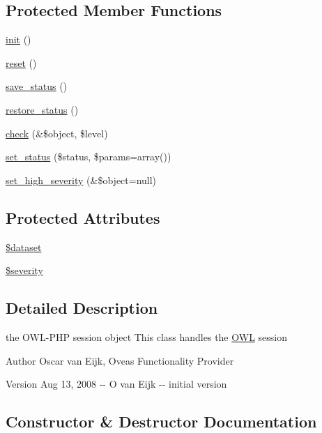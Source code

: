 \subsection*{Protected Member Functions}
\begin{DoxyCompactItemize}
\item 
\hyperlink{class__OWL_ae0ef3ded56e8a6b34b6461e5a721cd3e}{init} ()
\item 
\hyperlink{class__OWL_a2f2a042bcf31965194c03033df0edc9b}{reset} ()
\item 
\hyperlink{class__OWL_a9e49b9c76fbc021b244c6915ea536d71}{save\_\-status} ()
\item 
\hyperlink{class__OWL_a465eeaf40edd9f9c848841700c32ce55}{restore\_\-status} ()
\item 
\hyperlink{class__OWL_ad6f4f6946f40199dd0333cf219fa500e}{check} (\&\$object, \$level)
\item 
\hyperlink{class__OWL_aea912d0ede9b3c2a69b79072d94d4787}{set\_\-status} (\$status, \$params=array())
\item 
\hyperlink{class__OWL_a576829692a3b66e3d518853bf43abae3}{set\_\-high\_\-severity} (\&\$object=null)
\end{DoxyCompactItemize}
\subsection*{Protected Attributes}
\begin{DoxyCompactItemize}
\item 
\hyperlink{classSessionHandler_a74c46fcfbadd4c4e6bacc73ddf350056}{\$dataset}
\item 
\hyperlink{class__OWL_ad26b40a9dbbacb33e299b17826f8327c}{\$severity}
\end{DoxyCompactItemize}


\subsection{Detailed Description}
the OWL-\/PHP session object This class handles the \hyperlink{classOWL}{OWL} session \begin{DoxyAuthor}{Author}
Oscar van Eijk, Oveas Functionality Provider 
\end{DoxyAuthor}
\begin{DoxyVersion}{Version}
Aug 13, 2008 -\/-\/ O van Eijk -\/-\/ initial version 
\end{DoxyVersion}


\subsection{Constructor \& Destructor Documentation}
